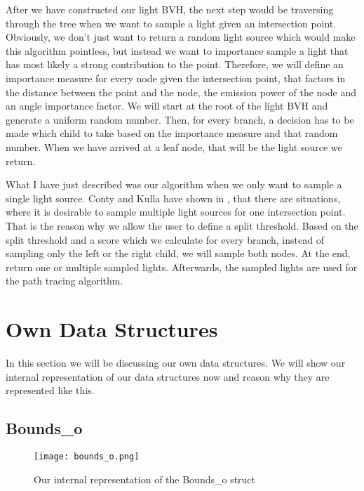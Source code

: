 After we have constructed our light BVH, the next step would be traversing through the tree when we want to sample a light given an intersection point. Obviously, we don't just want to return a random light source which would make this algorithm pointless, but instead we want to importance sample a light that has most likely a strong contribution to the point. Therefore, we will define an importance measure for every node given the intersection point, that factors in the distance between the point and the node, the emission power of the node and an angle importance factor. We will start at the root of the light BVH and generate a uniform random number. Then, for every branch, a decision has to be made which child to take based on the importance measure and that random number. When we have arrived at a leaf node, that will be the light source we return.

What I have just described was our algorithm when we only want to sample a single light source. Conty and Kulla have shown in \cite{MLS}, that there are situations, where it is desirable to sample multiple light sources for one intersection point. That is the reason why we allow the user to define a split threshold. Based on the split threshold and a score which we calculate for every branch, instead of sampling only the left or the right child, we will sample both nodes. At the end, return one or multiple sampled lights. Afterwards, the sampled lights are used for the path tracing algorithm.

\section{Own Data Structures}
\label{sec:alg:ows}

In this section we will be discussing our own data structures. We will show our internal representation of our data structures now and reason why they are represented like this.

\subsection{Bounds\_o}

\begin{figure}
	\begin{center}
		\texttt{[image: bounds\_o.png]}
		\caption{Our internal representation of the Bounds\_o struct}
		\label{fig:boundso}
	\end{center}
\end{figure}

